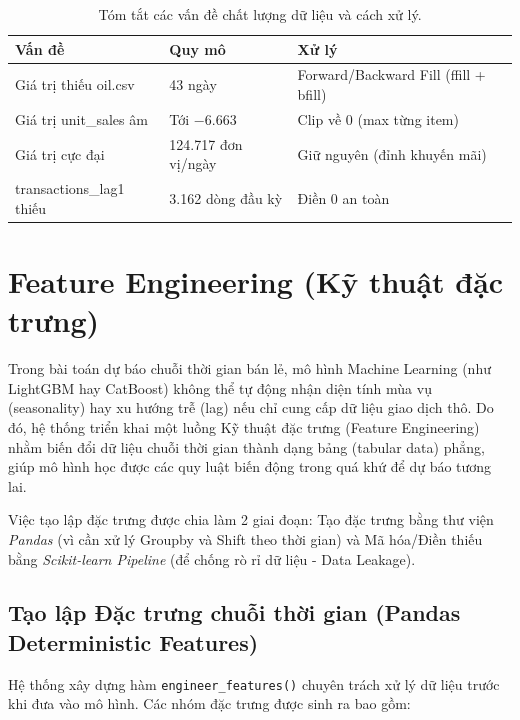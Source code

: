 \documentclass[12pt,a4paper]{report}
\begin{document}
\begin{table}[h!]
\centering
\begin{tabular}{@{}llp{8cm}@{}}
\toprule
\textbf{Vấn đề} & \textbf{Quy mô} & \textbf{Xử lý} \\
\midrule
Giá trị thiếu oil.csv & 43 ngày & Forward/Backward Fill (ffill + bfill) \\
Giá trị unit\_sales âm & Tới $-6.663$ & Clip về 0 (max từng item) \\
Giá trị cực đại & 124.717 đơn vị/ngày & Giữ nguyên (đỉnh khuyến mãi) \\
transactions\_lag1 thiếu & 3.162 dòng đầu kỳ & Điền 0 an toàn \\
\bottomrule
\end{tabular}
\caption{Tóm tắt các vấn đề chất lượng dữ liệu và cách xử lý.}
\end{table}

\section{Feature Engineering (Kỹ thuật đặc trưng)}

Trong bài toán dự báo chuỗi thời gian bán lẻ, mô hình Machine Learning (như LightGBM hay CatBoost) không thể tự động nhận diện tính mùa vụ (seasonality) hay xu hướng trễ (lag) nếu chỉ cung cấp dữ liệu giao dịch thô. Do đó, hệ thống triển khai một luồng Kỹ thuật đặc trưng (Feature Engineering) nhằm biến đổi dữ liệu chuỗi thời gian thành dạng bảng (tabular data) phẳng, giúp mô hình học được các quy luật biến động trong quá khứ để dự báo tương lai.

Việc tạo lập đặc trưng được chia làm 2 giai đoạn: Tạo đặc trưng bằng thư viện \textit{Pandas} (vì cần xử lý Groupby và Shift theo thời gian) và Mã hóa/Điền thiếu bằng \textit{Scikit-learn Pipeline} (để chống rò rỉ dữ liệu - Data Leakage).

\subsection{Tạo lập Đặc trưng chuỗi thời gian (Pandas Deterministic Features)}
Hệ thống xây dựng hàm \texttt{engineer\_features()} chuyên trách xử lý dữ liệu trước khi đưa vào mô hình. Các nhóm đặc trưng được sinh ra bao gồm:
\end{document}
